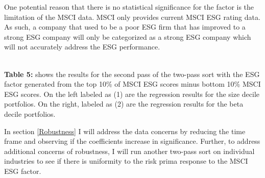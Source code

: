 One potential reason that there is no statistical significance for the factor is the limitation of the MSCI data. MSCI only provides current  MSCI ESG rating data. As such, a company that used to be a  poor ESG firm that has improved to a strong ESG company will only be categorized as a strong ESG company which will not accurately address the ESG performance.  


\begin{center}
    \paperspacingnarrow
    
    \\
    \textbf{Table 5:} shows the results for the second pass of the two-pass sort with the ESG factor generated from the top 10\% of MSCI ESG scores minus bottom 10\% MSCI ESG scores. On the left labeled as (1) are the regression results for the size decile portfolios. On the right, labeled as (2) are the regression results for the beta decile portfolios.
    
    \paperspacingwide
\end{center}

In section \ref{Robustness} I will address the data concerns by reducing the time frame and observing if the coefficients increase in significance. Further, to address additional concerns of robustness, I will run another two-pass sort on individual industries to see if there is uniformity to the risk prima response to the MSCI ESG factor.
